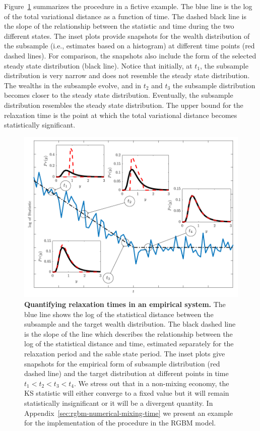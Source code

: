 \documentclass[11pt]{article}
\newcommand{\Fref}[1]{Figure~\ref{fig:#1}}
\numberwithin{equation}{section}
\begin{document}
\Fref{mixing-time} summarizes the procedure in a fictive example. The blue line is the log of the total variational distance as a function of time. The dashed black line is the slope of the relationship between the statistic and time during the two different states. The inset plots provide snapshots for the wealth distribution of the subsample (i.e., estimates based on a histogram) at different time points (red dashed lines). For comparison, the snapshots also include the form of the selected steady state distribution (black line). Notice that initially, at $t_1$, the subsample distribution is very narrow and does not resemble the steady state distribution. The wealths in the subsample evolve, and in $t_2$ and $t_3$ the subsample distribution becomes closer to the steady state distribution. Eventually, the subsample distribution resembles the steady state distribution. The upper bound for the relaxation time is the point at which the total variational distance becomes statistically significant. 

\begin{figure}[!htb]
\centering
\includegraphics[width=1.0\textwidth]{figs/fig_mixing_time.pdf}
\caption{\textbf{Quantifying relaxation times in an empirical system.} The blue line shows the log of the statistical distance between the subsample and the target wealth distribution. The black dashed line is the slope of the line which describes the relationship between the log of the statistical distance and time, estimated separately for the relaxation period and the sable state period. The inset plots give snapshots for the empirical form of subsample distribution (red dashed line) and the target distribution at different points in time $t_1 < t_2 < t_3 < t_4$. We stress out that in a non-mixing economy, the KS statistic will either converge to a fixed value but it will remain statistically insignificant or it will be a divergent quantity. In Appendix~\ref{sec:rgbm-numerical-mixing-time} we present an example for the implementation of the procedure in the RGBM model.
\label{fig:mixing-time}}
\end{figure}
\FloatBarrier
\end{document}

